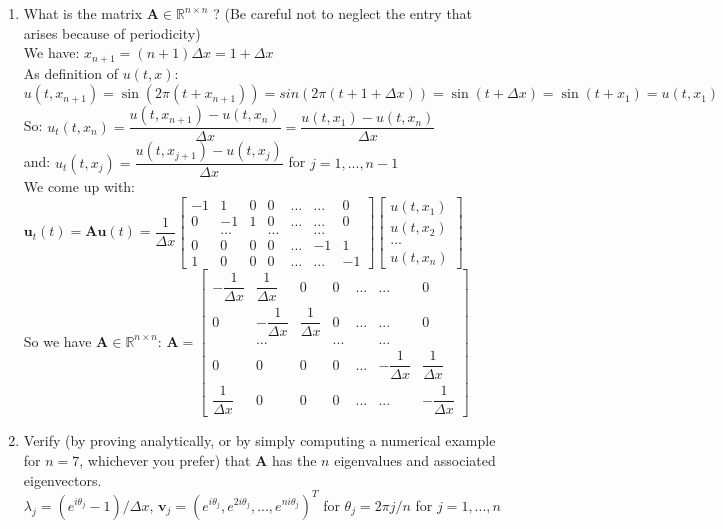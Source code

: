 \documentclass[14pt,a4paper]{article}
\begin{document}
\begin{enumerate}
	\label{4a}
	\item What is the matrix $\textbf{A} \in \mathbb{R}^{n\times n}$ ? (Be careful not to neglect the entry that arises because of periodicity)\\
	We have: $x_{n+1} = (n+1)\Delta x = 1 + \Delta x$\\
	As definition of $u(t,x)$:\\ $u(t,x_{n+1}) = \sin(2\pi(t+x_{n+1})) = sin(2\pi(t+ 1 + \Delta x)) = \sin(t+\Delta x) = \sin(t+x_1) = u(t,x_1)$ \\
	So: $u_t(t,x_n) = \dfrac{u(t,x_{n+1}) - u(t,x_n)}{\Delta x} = \dfrac{u(t,x_1) - u(t,x_n)}{\Delta x}$\\
	and: $u_t(t,x_j) = \dfrac{u(t,x_{j+1}) - u(t,x_j)}{\Delta x}$ \hspace*{1cm} for $j = 1, ..., n-1$\\ 
	We come up with:\\
	\hspace*{2cm} $\textbf{u}_t(t) = \textbf{Au}(t) = \dfrac{1}{\Delta x}\begin{bmatrix} -1&1&0&0 & ...&... &0 \\ 0&-1&1&0& ...&... &0 \\ &... & & ... && ... \\0&0&0&0&... &-1&1 \\ 1& 0&0&0 & ...&... &-1 \end{bmatrix} \begin{bmatrix} u(t,x_1)\\ u(t,x_2) \\ ... \\ u(t,x_n) \end{bmatrix} $\\
	So we have $\textbf{A} \in \mathbb{R}^{n\times n}$: $\textbf{A} = \begin{bmatrix} -\dfrac{1}{\Delta x}&\dfrac{1}{\Delta x}&0&0 & ...&... &0 \\ 0&-\dfrac{1}{\Delta x}&\dfrac{1}{\Delta x}&0& ...&... &0 \\ &... & & ... && ... \\0&0&0&0&... &-\dfrac{1}{\Delta x}&\dfrac{1}{\Delta x} \\ \dfrac{1}{\Delta x}& 0&0&0 & ...&... &-\dfrac{1}{\Delta x}\end{bmatrix}$ \\
	
	\label{4b}	
	\item Verify (by proving analytically, or by simply computing a numerical example for $n =7$, whichever you prefer) that \textbf{A} has the $n$ eigenvalues and associated eigenvectors.\\
	\hspace*{0.5cm} $\lambda_j = (e^{i\theta_j} - 1)/\Delta x$, \hspace{0.3cm} $\textbf{v}_j = (e^{i\theta_j}, e^{2i\theta_j}, ..., e^{ni\theta_j})^T$ \hspace{0.3cm} for $\theta_j = 2\pi j/n$ for $j = 1, ..., n$
	

\end{enumerate}
\end{document}
